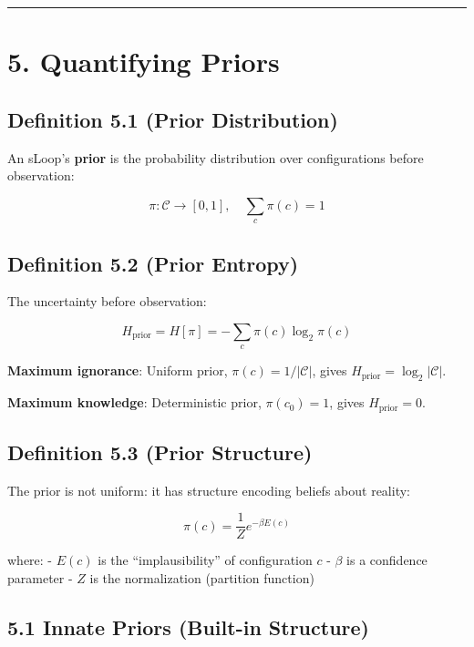 \documentclass[
  11pt,
  letterpaper,
  twoside,
  openright]{book}
\begin{document}
\begin{center}\rule{0.5\linewidth}{0.5pt}\end{center}

\section{5. Quantifying Priors}\label{quantifying-priors}

\subsection{Definition 5.1 (Prior
Distribution)}\label{definition-5.1-prior-distribution}

An sLoop's \textbf{prior} is the probability distribution over
configurations before observation:

\[\pi: \mathcal{C} \to [0, 1], \quad \sum_c \pi(c) = 1\]

\subsection{Definition 5.2 (Prior
Entropy)}\label{definition-5.2-prior-entropy}

The uncertainty before observation:

\[H_{\text{prior}} = H[\pi] = -\sum_c \pi(c) \log_2 \pi(c)\]

\textbf{Maximum ignorance}: Uniform prior, \(\pi(c) = 1/|\mathcal{C}|\),
gives \(H_{\text{prior}} = \log_2 |\mathcal{C}|\).

\textbf{Maximum knowledge}: Deterministic prior, \(\pi(c_0) = 1\), gives
\(H_{\text{prior}} = 0\).

\subsection{Definition 5.3 (Prior
Structure)}\label{definition-5.3-prior-structure}

The prior is not uniform: it has structure encoding beliefs about
reality:

\[\pi(c) = \frac{1}{Z} e^{-\beta E(c)}\]

where: - \(E(c)\) is the ``implausibility'' of configuration \(c\) -
\(\beta\) is a confidence parameter - \(Z\) is the normalization
(partition function)

\subsection{5.1 Innate Priors (Built-in
Structure)}\label{innate-priors-built-in-structure}
\end{document}
